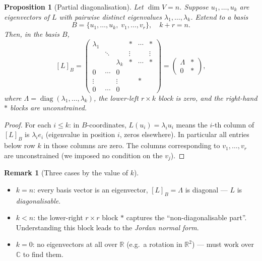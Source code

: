 \documentclass[11pt]{article}
\theoremstyle{definition}
\newtheorem{remark}{Remark}[section]
\theoremstyle{plain}
\newtheorem{proposition}{Proposition}[section]
\begin{document}
\begin{proposition}[Partial diagonalisation]\label{prop:partial-diag}
  Let $\dim V = n$.  Suppose $u_1,\ldots,u_k$ are eigenvectors of $L$
  with pairwise distinct eigenvalues $\lambda_1,\ldots,\lambda_k$.
  Extend to a basis
  \[
    B = \{u_1,\ldots,u_k,\; v_1,\ldots,v_r\}, \quad k + r = n.
  \]
  Then, in the basis $B$,
  \[
    [L]_B =
    \begin{pmatrix}
      \lambda_1 &        &           & * & \cdots & * \\
                & \ddots &           & \vdots & & \vdots \\
                &        & \lambda_k & * & \cdots & * \\
      0 & \cdots & 0         &   &        &   \\
      \vdots & & \vdots   &   & *      &   \\
      0 & \cdots & 0         &   &        &
    \end{pmatrix}
    =
    \begin{pmatrix} \Lambda & * \\ 0 & * \end{pmatrix},
  \]
  where $\Lambda = \operatorname{diag}(\lambda_1,\ldots,\lambda_k)$,
  the lower-left $r\times k$ block is zero, and the right-hand $*$ blocks
  are unconstrained.
\end{proposition}
\begin{proof}
  For each $i \le k$: in $B$-coordinates,
  $L(u_i) = \lambda_i u_i$ means the $i$-th column of $[L]_B$ is
  $\lambda_i e_i$ (eigenvalue in position $i$, zeros elsewhere).
  In particular all entries below row $k$ in those columns are zero.
  The columns corresponding to $v_1,\ldots,v_r$ are unconstrained
  (we imposed no condition on the $v_j$).
\end{proof}

\begin{remark}[Three cases by the value of $k$]
  \leavevmode
  \begin{itemize}
    \item $k = n$: every basis vector is an eigenvector,
          $[L]_B = \Lambda$ is diagonal --- $L$ is \emph{diagonalisable}.
    \item $k < n$: the lower-right $r\times r$ block $*$ captures
          the ``non-diagonalisable part''.  Understanding this block
          leads to the \emph{Jordan normal form}.
    \item $k = 0$: no eigenvectors at all over $\mathbb{R}$
          (e.g.\ a rotation in $\mathbb{R}^2$) --- must work over
          $\mathbb{C}$ to find them.
  \end{itemize}
\end{remark}
\end{document}
